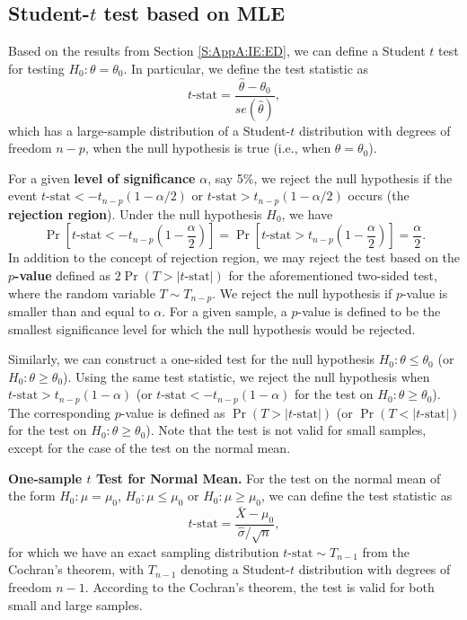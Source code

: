 \documentclass[]{book}
\theoremstyle{definition}
\theoremstyle{definition}
\theoremstyle{definition}
\theoremstyle{remark}
\begin{document}
\subsection{\texorpdfstring{Student-\(t\) test based on
MLE}{Student-t test based on MLE}}\label{student-t-test-based-on-mle}

Based on the results from Section \ref{S:AppA:IE:ED}, we can define a
Student \(t\) test for testing \(H_0:\theta=\theta_0\). In particular,
we define the test statistic as
\[t\text{-stat}=\frac{\hat{\theta}-\theta_0}{se(\hat{\theta})},\] which
has a large-sample distribution of a Student-\(t\) distribution with
degrees of freedom \({n-p}\), when the null hypothesis is true (i.e.,
when \(\theta=\theta_0\)).

For a given \textbf{level of significance} \(\alpha\), say 5\%, we
reject the null hypothesis if the event
\(t\text{-stat}<-t_{n-p}\left(1-{\alpha}/{2}\right)\) or
\(t\text{-stat}> t_{n-p}\left(1-{\alpha}/{2}\right)\) occurs (the
\textbf{rejection region}). Under the null hypothesis \(H_0\), we have
\[\Pr\left[t\text{-stat}<-t_{n-p}\left(1-\frac{\alpha}{2}\right)\right]=\Pr\left[t\text{-stat}> t_{n-p}\left(1-\frac{\alpha}{2}\right) \right]= \frac{\alpha}{2}.\]
In addition to the concept of rejection region, we may reject the test
based on the \(p\)\textbf{-value} defined as \(2\Pr(T>|t\text{-stat}|)\)
for the aforementioned two-sided test, where the random variable
\(T\sim T_{n-p}\). We reject the null hypothesis if \(p\)-value is
smaller than and equal to \(\alpha\). For a given sample, a \(p\)-value
is defined to be the smallest significance level for which the null
hypothesis would be rejected.

Similarly, we can construct a one-sided test for the null hypothesis
\(H_0:\theta\leq\theta_0\) (or \(H_0:\theta\geq\theta_0\)). Using the
same test statistic, we reject the null hypothesis when
\(t\text{-stat}> t_{n-p}\left(1-{\alpha}\right)\) (or
\(t\text{-stat}<- t_{n-p}\left(1-{\alpha}\right)\) for the test on
\(H_0:\theta\geq\theta_0\)). The corresponding \(p\)-value is defined as
\(\Pr(T>|t\text{-stat}|)\) (or \(\Pr(T<|t\text{-stat}|)\) for the test
on \(H_0:\theta\geq\theta_0\)). Note that the test is not valid for
small samples, except for the case of the test on the normal mean.

\textbf{One-sample \(t\) Test for Normal Mean.} For the test on the
normal mean of the form \(H_0:\mu=\mu_0\), \(H_0:\mu\leq\mu_0\) or
\(H_0:\mu\geq\mu_0\), we can define the test statistic as
\[t\text{-stat}=\frac{\bar{X}-\mu_0}{{\hat{\sigma}}/{\sqrt{n}}},\] for
which we have an exact sampling distribution
\(t\text{-stat}\sim T_{n-1}\) from the Cochran's theorem, with
\(T_{n-1}\) denoting a Student-\(t\) distribution with degrees of
freedom \(n-1\). According to the Cochran's theorem, the test is valid
for both small and large samples.
\end{document}
